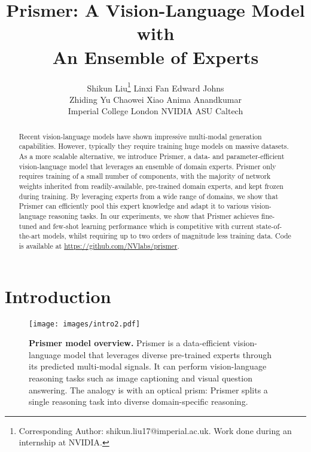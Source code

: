 \documentclass[11pt]{article}
\begin{document}
\title{Prismer: A Vision-Language Model with  \\ An Ensemble of Experts}

\author{
  Shikun Liu\thanks{Corresponding Author: shikun.liu17@imperial.ac.uk. Work done during an internship at NVIDIA.}
  \qquad Linxi Fan \qquad Edward Johns \\ \medskip
Zhiding Yu \qquad  Chaowei Xiao \qquad  Anima Anandkumar \\ \medskip
 \small Imperial College London \qquad NVIDIA \qquad  ASU \qquad Caltech
}

\date{}

\maketitle

\begin{abstract}
  Recent vision-language models have shown impressive multi-modal generation capabilities. However, typically they require training huge models on massive datasets. As a more scalable alternative, we introduce Prismer, a data- and parameter-efficient vision-language model that leverages an ensemble of domain experts. Prismer only requires training of a small number of components, with the majority of network weights inherited from readily-available, pre-trained domain experts, and kept frozen during training. By leveraging experts from a wide range of domains, we show that Prismer can efficiently pool this expert knowledge and adapt it to various vision-language reasoning tasks. In our experiments, we show that Prismer achieves fine-tuned and few-shot learning performance which is competitive with current state-of-the-art models, whilst requiring up to two orders of magnitude less training data.  Code is available at \url{https://github.com/NVlabs/prismer}.
\end{abstract}

\section{Introduction}
\label{sec:intro}

\begin{figure}[t!]
  \centering
  \texttt{[image: images/intro2.pdf]}
  \caption{{\bf Prismer model overview.} Prismer is a data-efficient vision-language model that leverages diverse pre-trained experts through its predicted multi-modal signals. It can perform vision-language reasoning tasks such as image captioning and visual question answering. The analogy is with an optical prism: Prismer splits a single reasoning task into diverse domain-specific reasoning.}
  \label{fig:expert}  
\end{figure}
\end{document}
